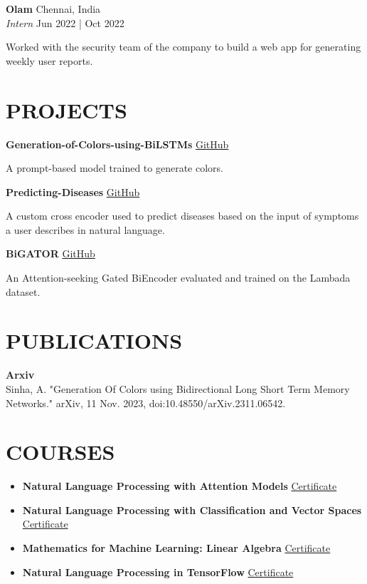 \documentclass[a4paper,9pt]{extarticle}
\begin{document}
\noindent
\textbf{Olam} \hfill Chennai, India\\ %
\textit{Intern} \hfill Jun 2022 | Oct 2022 %

Worked with the security team of the company to build a web app for generating weekly user reports.

\section*{PROJECTS}
\noindent
\textbf{Generation-of-Colors-using-BiLSTMs} \href{https://github.com/chungimungi/Generation-of-Colors-using-BiLSTMs}{GitHub}

A prompt-based model trained to generate colors.

\noindent
\textbf{Predicting-Diseases} \href{https://github.com/chungimungi/Predicting_Diseases}{GitHub}

A custom cross encoder used to predict diseases based on the input of symptoms a user describes in natural language.

\noindent
\textbf{BiGATOR} \href{https://github.com/chungimungi/BiGATOR}{GitHub}

An Attention-seeking Gated BiEncoder evaluated and trained on the Lambada dataset.

\section*{PUBLICATIONS}
\noindent
\textbf{Arxiv}\\
Sinha, A. "Generation Of Colors using Bidirectional Long Short Term Memory Networks." \newline arXiv, 11 Nov. 2023, doi:10.48550/arXiv.2311.06542.

\section*{COURSES}
\begin{itemize}
    \item \textbf{Natural Language Processing with Attention Models}
    \href{https://www.coursera.org/account/accomplishments/certificate/V3WGDV276MN3}{Certificate}

    \item \textbf{Natural Language Processing with Classification and Vector Spaces}
    \href{https://www.coursera.org/account/accomplishments/certificate/5TYQZQ95QMC2}{Certificate}

    \item \textbf{Mathematics for Machine Learning: Linear Algebra}
    \href{https://www.coursera.org/account/accomplishments/certificate/KPHRWM5J3BZP}{Certificate}

    \item \textbf{Natural Language Processing in TensorFlow}
    \href{https://www.coursera.org/account/accomplishments/verify/XQ3U9NY2BUKA}{Certificate}
\end{itemize}
\end{document}

